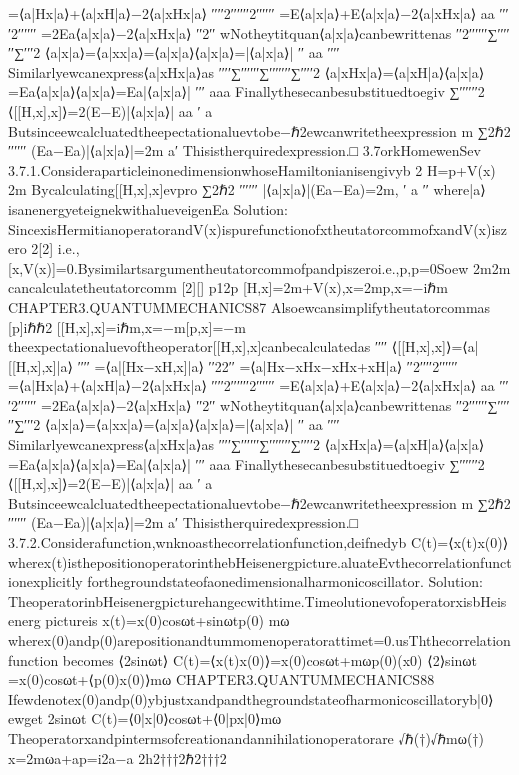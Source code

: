 {{=⟨a|Hx|a⟩+⟨a|xH|a⟩−2⟨a|xHx|a⟩
′′′′2′′′′′′2′′′′′′
=E⟨a|x|a⟩+E⟨a|x|a⟩−2⟨a|xHx|a⟩
aa
′′′′2′′′′′′
=2Ea⟨a|x|a⟩−2⟨a|xHx|a⟩
′′2′′
wNotheytitquan⟨a|x|a⟩canbewrittenas
′′2′′′′′′∑′′′′′′∑′′′2
⟨a|x|a⟩=⟨a|xx|a⟩=⟨a|x|a⟩⟨a|x|a⟩=|⟨a|x|a⟩|
′′
aa
′′′′
Similarlyewcanexpress⟨a|xHx|a⟩as
′′′′∑′′′′′′∑′′′′′′′∑′′′′2
⟨a|xHx|a⟩=⟨a|xH|a⟩⟨a|x|a⟩=Ea⟨a|x|a⟩⟨a|x|a⟩=Ea|⟨a|x|a⟩|
′′′
aaa
Finallythesecanbesubstituedtoegiv
∑′′′′′′2
⟨[[H,x],x]⟩=2(E−E)|⟨a|x|a⟩|
aa
′
a
Butsinceewcalcluatedtheepectationaluevtobe−ℏ2ewcanwritetheexpression
m
∑2ℏ2
′′′′′′
(Ea−Ea)|⟨a|x|a⟩|=2m
a′
Thisistherquiredexpression.□
3.7orkHomewenSev
3.7.1.ConsideraparticleinonedimensionwhoseHamiltonianisengivyb
2
H=p+V(x)
2m
Bycalculating[[H,x],x]evpro
∑2ℏ2
′′′′′′
|⟨a|x|a⟩|(Ea−Ea)=2m,
′
a
′′
where|a⟩isanenergyeteignekwithalueveigenEa
Solution:
SincexisHermitianoperatorandV(x)ispurefunctionofxtheutatorcommofxandV(x)iszero
2[2]
i.e.,[x,V(x)]=0.Bysimilartsargumentheutatorcommofpandpiszeroi.e.,p,p=0Soew
2m2m
cancalculatetheutatorcomm
[2][]
p12p
[H,x]=2m+V(x),x=2mp,x=−iℏm
CHAPTER3.QUANTUMMECHANICS87
Alsoewcansimplifytheutatorcommas
[p]iℏℏ2
[[H,x],x]=iℏm,x=−m[p,x]=−m
theexpectationaluevoftheoperator[[H,x],x]canbecalculatedas
′′′′
⟨[[H,x],x]⟩=⟨a|[[H,x],x]|a⟩
′′′′
=⟨a|[Hx−xH,x]|a⟩
′′22′′
=⟨a|Hx−xHx−xHx+xH|a⟩
′′2′′′′2′′′′′′
=⟨a|Hx|a⟩+⟨a|xH|a⟩−2⟨a|xHx|a⟩
′′′′2′′′′′′2′′′′′′
=E⟨a|x|a⟩+E⟨a|x|a⟩−2⟨a|xHx|a⟩
aa
′′′′2′′′′′′
=2Ea⟨a|x|a⟩−2⟨a|xHx|a⟩
′′2′′
wNotheytitquan⟨a|x|a⟩canbewrittenas
′′2′′′′′′∑′′′′′′∑′′′2
⟨a|x|a⟩=⟨a|xx|a⟩=⟨a|x|a⟩⟨a|x|a⟩=|⟨a|x|a⟩|
′′
aa
′′′′
Similarlyewcanexpress⟨a|xHx|a⟩as
′′′′∑′′′′′′∑′′′′′′′∑′′′′2
⟨a|xHx|a⟩=⟨a|xH|a⟩⟨a|x|a⟩=Ea⟨a|x|a⟩⟨a|x|a⟩=Ea|⟨a|x|a⟩|
′′′
aaa
Finallythesecanbesubstituedtoegiv
∑′′′′′′2
⟨[[H,x],x]⟩=2(E−E)|⟨a|x|a⟩|
aa
′
a
Butsinceewcalcluatedtheepectationaluevtobe−ℏ2ewcanwritetheexpression
m
∑2ℏ2
′′′′′′
(Ea−Ea)|⟨a|x|a⟩|=2m
a′
Thisistherquiredexpression.□
3.7.2.Considerafunction,wnknoasthecorrelationfunction,deifnedyb
C(t)=⟨x(t)x(0)⟩
wherex(t)isthepositionoperatorinthebHeisenergpicture.aluateEvthecorrelationfunctionexplicitly
forthegroundstateofaonedimensionalharmonicoscillator.
Solution:
TheoperatorinbHeisenergpicturehangecwithtime.TimeolutionevofoperatorxisbHeisenerg
pictureis
x(t)=x(0)cosωt+sinωtp(0)
mω
wherex(0)andp(0)arepositionandtummomenoperatorattimet=0.usThthecorrelationfunction
becomes
⟨2sinωt⟩
C(t)=⟨x(t)x(0)⟩=x(0)cosωt+mωp(0)(x0)
⟨2⟩sinωt
=x(0)cosωt+⟨p(0)x(0)⟩mω
CHAPTER3.QUANTUMMECHANICS88
Ifewdenotex(0)andp(0)ybjustxandpandthegroundstateofharmonicoscillatoryb|0⟩ewget
2sinωt
C(t)=⟨0|x|0⟩cosωt+⟨0|px|0⟩mω
Theoperatorxandpintermsofcreationandannihilationoperatorare
√ℏ(†)√ℏmω(†)
x=2mωa+ap=i2a−a
2h2†††2ℏ2†††2
}}
